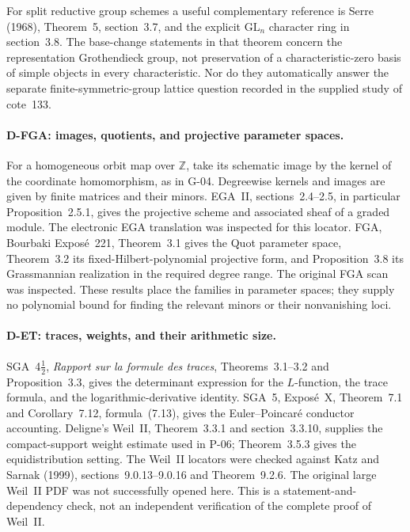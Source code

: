 For split reductive group schemes a useful complementary reference is Serre (1968), Theorem~5, section~3.7, and the explicit $\mathrm{GL}_n$ character ring in section~3.8. The base-change statements in that theorem concern the representation Grothendieck group, not preservation of a characteristic-zero basis of simple objects in every characteristic. Nor do they automatically answer the separate finite-symmetric-group lattice question recorded in the supplied study of cote~133.

\paragraph{D-FGA: images, quotients, and projective parameter spaces.}
For a homogeneous orbit map over $\mathbb Z$, take its schematic image by the kernel of the coordinate homomorphism, as in G-04. Degreewise kernels and images are given by finite matrices and their minors. EGA~II, sections~2.4--2.5, in particular Proposition~2.5.1, gives the projective scheme and associated sheaf of a graded module. The electronic EGA translation was inspected for this locator. FGA, Bourbaki Expos\'e~221, Theorem~3.1 gives the Quot parameter space, Theorem~3.2 its fixed-Hilbert-polynomial projective form, and Proposition~3.8 its Grassmannian realization in the required degree range. The original FGA scan was inspected. These results place the families in parameter spaces; they supply no polynomial bound for finding the relevant minors or their nonvanishing loci.

\paragraph{D-ET: traces, weights, and their arithmetic size.}
SGA~4$\frac12$, \emph{Rapport sur la formule des traces}, Theorems~3.1--3.2 and Proposition~3.3, gives the determinant expression for the $L$-function, the trace formula, and the logarithmic-derivative identity. SGA~5, Expos\'e~X, Theorem~7.1 and Corollary~7.12, formula~(7.13), gives the Euler--Poincar\'e conductor accounting. Deligne's Weil~II, Theorem~3.3.1 and section~3.3.10, supplies the compact-support weight estimate used in P-06; Theorem~3.5.3 gives the equidistribution setting. The Weil~II locators were checked against Katz and Sarnak (1999), sections~9.0.13--9.0.16 and Theorem~9.2.6. The original large Weil~II PDF was not successfully opened here. This is a statement-and-dependency check, not an independent verification of the complete proof of Weil~II.


